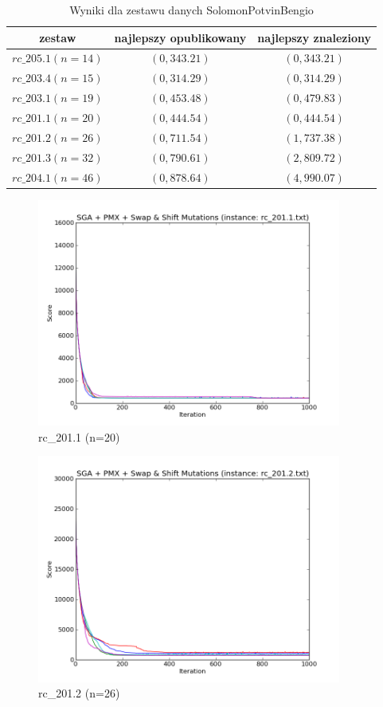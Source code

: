 \begin{frame}
\begin{table}
\centering
\caption{Wyniki dla zestawu danych SolomonPotvinBengio}
\begin{tabular}{c|c|c}
zestaw & najlepszy opublikowany & najlepszy znaleziony \\ \hline
$rc\_205.1 (n=14)$ & $(0, 343.21)$ & $(0, 343.21)$ \\
$rc\_203.4 (n=15)$ & $(0, 314.29)$ & $(0, 314.29)$ \\
$rc\_203.1 (n=19)$ & $(0, 453.48)$ & $(0, 479.83)$ \\
$rc\_201.1 (n=20)$ & $(0, 444.54)$ & $(0, 444.54)$ \\
$rc\_201.2 (n=26)$ & $(0, 711.54)$ & $(1, 737.38)$ \\
$rc\_201.3 (n=32)$ & $(0, 790.61)$ & $(2, 809.72)$ \\
$rc\_204.1 (n=46)$ & $(0, 878.64)$ & $(4, 990.07)$ 
\end{tabular}
\end{table}
\end{frame}

\begin{frame}
    \begin{figure}
        \centering
        \includegraphics[width=10cm]{charts/rc_201_1.png}
        \caption{rc\_201.1 (n=20)}
    \end{figure}
\end{frame}

\begin{frame}
    \begin{figure}
        \centering
        \includegraphics[width=10cm]{charts/rc_201_2.png}
        \caption{rc\_201.2 (n=26)}
    \end{figure}
\end{frame}

